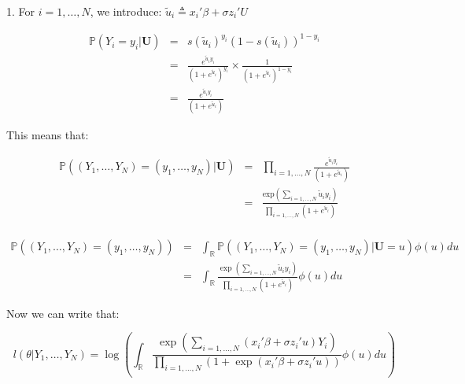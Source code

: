 	1. For $i=1,\dots,N$, we introduce: $\tilde{u}_i\triangleq x_i' \beta + \sigma z_i'U$
	
	\begin{eqnarray*}
		\mathbb{P}(Y_i=y_i\vert \textbf{U})&=& s(\tilde{u}_i)^{y_i}(1-s(\tilde{u}_i))^{1-y_i}\\
															&=& \frac{e^{\tilde{u}_i y_i}}{(1+e^{\tilde{u}_i})^{y_i}}\times \frac{1}{(1+e^{\tilde{u}_i})^{1-y_i}}\\
															&=& \frac{e^{\tilde{u}_i y_i}}{(1+e^{\tilde{u}_i})}
	\end{eqnarray*}
	
	This means that:
	
	\begin{eqnarray*}
		\mathbb{P}((Y_1,\dots,Y_N)=(y_1,\dots,y_N)\vert \textbf{U})&=& \prod_{i=1,\dots,N}\frac{e^{\tilde{u}_i y_i}}{(1+e^{\tilde{u}_i})}\\
												&=& \frac{\text{exp}(\sum_{i=1,\dots,N}\tilde{u}_i y_i)}{\prod_{i=1,\dots,N}(1+e^{\tilde{u}_i})}\\
	\end{eqnarray*}
	
	\begin{eqnarray*}
		\mathbb{P}((Y_1,\dots,Y_N)=(y_1,\dots,y_N))&=&\int_{\mathbb{R}}\mathbb{P}((Y_1,\dots,Y_N)=(y_1,\dots,y_N)\vert \textbf{U}=u) \phi(u) du\\
												&=& \int_{\mathbb{R}} \frac{\exp(\sum_{i=1,\dots,N}\tilde{u}_i y_i)}{\prod_{i=1,\dots,N}(1+e^{\tilde{u}_i})} \phi(u) du
	\end{eqnarray*}
	
	Now we can write that:
	
	$$l(\theta\vert Y_1,\dots,Y_N)=\log(\int_{\mathbb{R}} \frac{\exp(\sum_{i=1,\dots,N}(x_i' \beta + \sigma z_i'u) Y_i)}{\prod_{i=1,\dots,N}(1+\exp(x_i' \beta + \sigma z_i'u))} \phi(u) du)$$
	
